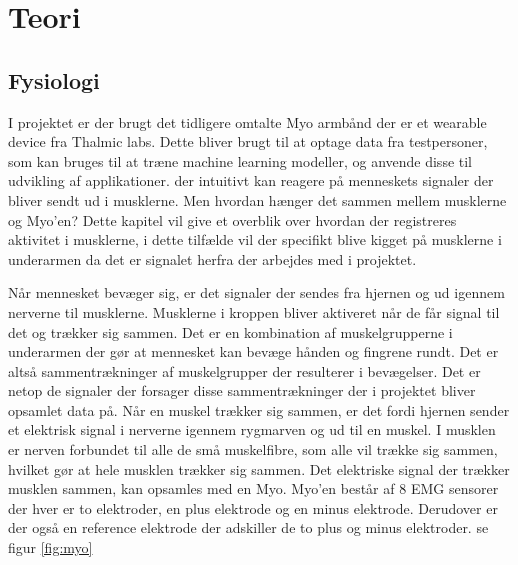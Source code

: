\thispagestyle{fancy}
\chapter{Teori}
\label{chp:teori}

\section{Fysiologi}
\label{sec:fysiologi}
I projektet er der brugt det tidligere omtalte Myo armbånd der er et wearable device fra Thalmic labs. Dette bliver brugt til at optage data fra testpersoner, som kan bruges til at træne machine learning modeller, og anvende disse til udvikling af applikationer. der intuitivt kan reagere på menneskets signaler der bliver sendt ud i musklerne. Men hvordan hænger det sammen mellem musklerne og Myo'en? Dette kapitel vil give et overblik over hvordan der registreres aktivitet i musklerne, i dette tilfælde vil der specifikt blive kigget på musklerne i underarmen da det er signalet herfra der arbejdes med i projektet.


Når mennesket bevæger sig, er det signaler der sendes fra hjernen og ud igennem nerverne til musklerne. Musklerne i kroppen bliver aktiveret når de får signal til det og trækker sig sammen. Det er en kombination af muskelgrupperne i underarmen der gør at mennesket kan bevæge hånden og fingrene rundt. Det er altså sammentrækninger af muskelgrupper der resulterer i bevægelser. Det er netop de signaler der forsager disse sammentrækninger der i projektet bliver opsamlet data på. Når en muskel trækker sig sammen, er det fordi hjernen sender et elektrisk signal i nerverne igennem rygmarven og ud til en muskel. I musklen er nerven forbundet til alle de små muskelfibre, som alle vil trække sig sammen, hvilket gør at hele musklen trækker sig sammen. Det elektriske signal der trækker musklen sammen, kan opsamles med en Myo. Myo'en består af 8 EMG sensorer der hver er to elektroder, en plus elektrode og en minus elektrode. Derudover er der også en reference elektrode der adskiller de to plus og minus elektroder. se figur \ref{fig:myo}

